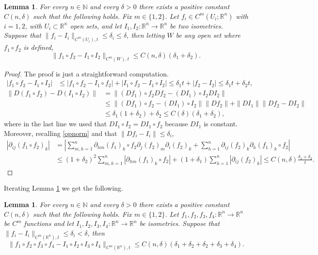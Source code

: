 \documentclass[11pt]{article}
\newcommand{\rr}{\mathbb{R}}
\theoremstyle{plain}
\newtheorem{lemma}[theorem]{Lemma}
\theoremstyle{definition}
\numberwithin{equation}{section}
\begin{document}
\begin{lemma}\label{iterateclosest}
	For every $n \in \mathbb{N}$ and every $\delta>0$ there exists a positive constant $C(n,\delta)$ such that the following holds. Fix $m\in \{1,2\}$. Let $f_i \in C^m(U_i ;\rr^n)$ with $i=1,2$, with $U_i \subset \rr^n$ open sets, and let $I_1,I_2 : \rr^n \to \rr^n$ be two isometries. Suppose that $\|f_i-I_i\|_{C^m(U_i),t}\le \delta_i\le \delta$, then letting $W$ be any open set where $f_1\circ f_2$ is defined,
	\begin{equation}\label{iterateclose}
		\|f_1\circ f_2 -I_1\circ I_2\|_{C^m(W),t}\le C(n,\delta)(\delta_1+\delta_2).
	\end{equation}
\end{lemma}
\begin{proof}
	The proof is just a straightforward computation.
	\begin{align*}
		|f_1\circ f_2 -I_1\circ I_2|&\le 	|f_1\circ f_2 -I_1\circ f_2|+	|I_1\circ f_2 -I_1\circ I_2|\le \delta_1t +|f_2-I_2|\le \delta_1t+\delta_2t,
	\end{align*}
	\begin{align*}
		\|	D(f_1\circ f_2)  -D(I_1\circ I_2)\|&= 	\|(Df_1)\circ f_2 Df_2 -(DI_1)\circ I_2 DI_2\|\\
		&\le\|(Df_1)\circ f_2 -(DI_1)\circ I_2\|\|Df_2\|+\|DI_1\|\|Df_2-DI_2\|\\
		&\le \delta_1 (1+\delta_2)+\delta_2\le C(\delta)(\delta_1+\delta_2),
	\end{align*}
 where in the last line we used that $DI_1\circ I_2=DI_1\circ f_2$ because $DI_1$ is constant.
	Moreover, recalling \eqref{opnorm} and that $\|Df_i-I_i\|\le \delta_i,$
	\begin{align*}
		|\partial_{ij}(f_1\circ f_2)_k|&=|\sum_{m,h=1}^n \partial_{hm}(f_1)_k\circ f_2\partial_j(f_2)_m\partial_i(f_2)_k+\sum_{h=1}^n\partial_{ij}(f_2)_k\partial_h(f_1)_k\circ f_2|\\
		&\le  (1+\delta_2)^2\sum_{m,h=1}^n |\partial_{hm}(f_1)_k\circ f_2|+ (1+\delta_1)\sum_{h=1}^n|\partial_{ij}(f_2)_k|\le C(n,\delta)\frac{\delta_1+\delta_2}{t}.
	\end{align*}
\end{proof}
Iterating Lemma \ref{iterateclosest} we get the following.
\begin{lemma}\label{iterateclosest2}
	For every $n \in \mathbb{N}$ and every $\delta>0$ there exists a positive constant $C(n,\delta)$ such that the following holds. Fix $m\in \{1,2\}$. Let $f_1,f_2,f_3,f_4: \rr^n \to \rr^n $ be $C^m$ functions and let $I_1,I_2,I_3,I_4 : \rr^n \to \rr^n$ be  isometries. Suppose that $\|f_i-I_i\|_{C^m(\rr^n),t}\le \delta_i<\delta$, then 
	\begin{equation}
		\|f_1\circ f_2 \circ f_3\circ f_4  -I_1\circ I_2\circ I_3\circ I_4\|_{C^m(\rr^n),t}\le C(n,\delta )(\delta_1+\delta_2+\delta_2+\delta_3+\delta_4).
	\end{equation}
\end{lemma}
\end{document}
